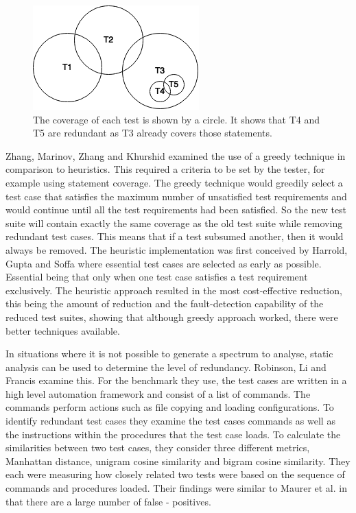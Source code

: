 \begin{figure}[h]
\begin{center}
\includegraphics[]{VennDiagram.png}
\end{center}
\caption{The coverage of each test is shown by a circle. It shows that T4 and T5 are redundant as T3 already covers those statements.}
\label{fig:venndiagram}
\end{figure}

Zhang, Marinov, Zhang and Khurshid \cite{zhang2011empirical} examined the use of a greedy technique in comparison to heuristics. This required a criteria to be set by the tester, for example using statement coverage. The greedy technique would greedily select a test case that satisfies the maximum number of unsatisfied test requirements and would continue until all the test requirements had been satisfied. So the new test suite will contain exactly the same coverage as the old test suite while removing redundant test cases. This means that if a test subsumed another, then it would always be removed. The heuristic implementation was first conceived by Harrold, Gupta and Soffa \cite{harrold1993methodology} where essential test cases are selected as early as possible. Essential being that only when one test case satisfies a test requirement exclusively. The heuristic approach resulted in the most cost-effective reduction, this being the amount of reduction and the fault-detection capability of the reduced test suites, showing that although greedy approach worked, there were better techniques available.

In situations where it is not possible to generate a spectrum to analyse, static analysis can be used to determine the level of redundancy. Robinson, Li and Francis \cite{li2008static} examine this. For the benchmark they use, the test cases are written in a high level automation framework and consist of a list of commands. The commands perform actions such as file copying and loading configurations. To identify redundant test cases they examine the test cases commands as well as the instructions within the procedures that the test case loads. To calculate the similarities between two test cases, they consider three different metrics, Manhattan distance, unigram cosine similarity and bigram cosine similarity. They each were measuring how closely related two tests were based on the sequence of commands and procedures loaded. Their findings were similar to Maurer et al. \cite{koochakzadeh2009test} in that there are a large number of false - positives.

